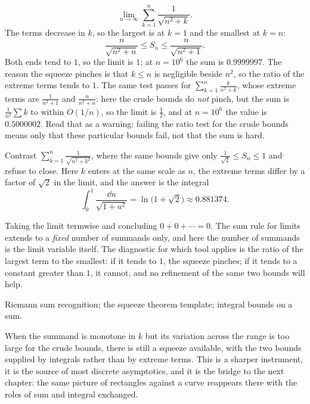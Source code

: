 \begin{worked}
\[\lim_{n\to\infty}\sum_{k=1}^{n}\frac{1}{\sqrt{n^{2}+k}}.\]
The terms decrease in $k$, so the largest is at $k=1$ and the smallest at $k=n$:
\[\frac{n}{\sqrt{n^{2}+n}}\leq S_{n}\leq\frac{n}{\sqrt{n^{2}+1}} .\]
Both ends tend to $1$, so the limit is $1$; at $n=10^{6}$ the sum is $0.9999997$. The reason the squeeze pinches is that $k\leq n$ is negligible beside $n^{2}$, so the ratio of the extreme terms tends to $1$. The same test passes for $\displaystyle\sum_{k=1}^{n}\frac{k}{n^{2}+k}$, whose extreme terms are $\tfrac{1}{n^{2}+1}$ and $\tfrac{n}{n^{2}+n}$: here the crude bounds do \emph{not} pinch, but the sum is $\tfrac{1}{n^{2}}\sum k$ to within $O(1/n)$, so the limit is $\tfrac12$, and at $n=10^{6}$ the value is $0.5000002$. Read that as a warning: failing the ratio test for the crude bounds means only that these particular bounds fail, not that the sum is hard.

Contrast $\displaystyle\sum_{k=1}^{n}\frac{1}{\sqrt{n^{2}+k^{2}}}$, where the same bounds give only $\tfrac{1}{\sqrt2}\leq S_{n}\leq1$ and refuse to close. Here $k$ enters at the same scale as $n$, the extreme terms differ by a factor of $\sqrt2$ in the limit, and the answer is the integral
\[\int_{0}^{1}\frac{\dd u}{\sqrt{1+u^{2}}}=\ln\bigl(1+\sqrt2\bigr)\approx0.881374 .\]
\end{worked}

\begin{trap}
Taking the limit termwise and concluding $0+0+\cdots=0$. The sum rule for limits extends to a \emph{fixed} number of summands only, and here the number of summands is the limit variable itself. The diagnostic for which tool applies is the ratio of the largest term to the smallest: if it tends to $1$, the squeeze pinches; if it tends to a constant greater than $1$, it cannot, and no refinement of the same two bounds will help.
\end{trap}

\begin{seealsob}Riemann sum recognition; the squeeze theorem template; integral bounds on a sum.\end{seealsob}

When the summand is monotone in $k$ but its variation across the range is too large for the crude bounds, there is still a squeeze available, with the two bounds supplied by integrals rather than by extreme terms. This is a sharper instrument, it is the source of most discrete asymptotics, and it is the bridge to the next chapter: the same picture of rectangles against a curve reappears there with the roles of sum and integral exchanged.

